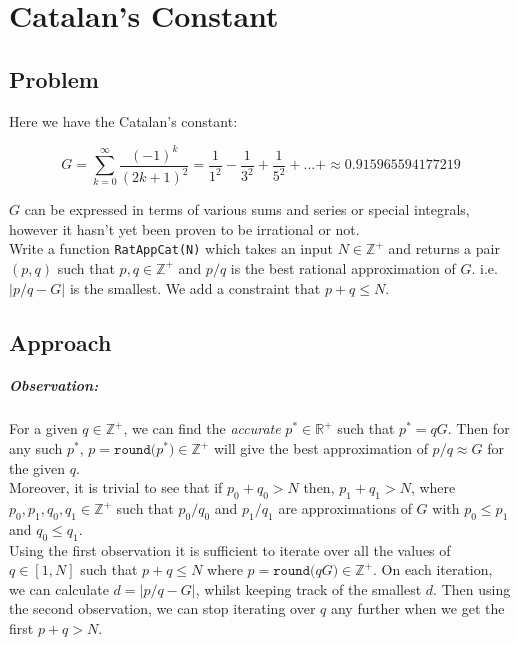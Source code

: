 \documentclass[11pt]{report}
\begin{document}
\chapter{Catalan's Constant}
\section*{Problem}
Here we have the Catalan's constant:

\begin{equation*}
	G = \sum_{k=0}^{\infty} \frac{(-1)^k}{(2k +1)^2} = \frac{1}{1^2} - \frac{1}{3^2} + \frac{1}{5^2} + ... + \approx 0.915965594177219
\end{equation*}

$G$ can be expressed in terms of various sums and series or special integrals, however it hasn't yet been proven to be irrational or not. \\

Write a function \texttt{RatAppCat(N)} which takes an input $N\in\mathbb{Z^+}$ and returns a pair $(p, q)$ such that $p,q\in\mathbb{Z^+}$ and $p/q$ is the best rational approximation of $G$. i.e. $|p/q-G|$ is the smallest. We add a constraint that $p+q\leqslant N$.

\section{Approach}

\paragraph{Observation:}
For a given $q\in\mathbb{Z^+}$, we can find the \textit{accurate} $p^*\in\mathbb{R^+}$ such that $p^*=qG$. Then for any such $p^*$, $p=\texttt{round(}p^*\texttt{)} \in \mathbb{Z^+}$ will give the best approximation of $p/q \approx G$ for the given $q$. \\

Moreover, it is trivial to see that  if $p_0 + q_0 > N$ then, $p_1 + q_1 > N$, where $p_0, p_1, q_0, q_1 \in \mathbb{Z^+}$ such that $p_0/q_0$ and $p_1/q_1$ are approximations of $G$ with $p_0 \leq p_1$ and $q_0 \leq q_1$. \\

Using the first observation it is sufficient to iterate over all the values of $q\in[1,N]$ such that $p+q\leq N$ where $p = \texttt{round(}qG\texttt{)} \in \mathbb{Z^+}$. On each iteration, we can calculate $d = |p/q - G|$, whilst keeping track of the smallest $d$. Then using the second observation, we can stop iterating over $q$ any further when we get the first $p+q>N$. \\
\end{document}
